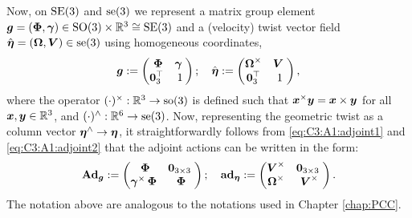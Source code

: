 %
Now, on $\textup{\textrm{SE}}(3)$ and $\textup{\textrm{se}}(3)$ we represent a matrix group element ${\boldsymbol{g}} = ({\boldsymbol{\Phi}}, {\boldsymbol{\gamma}}) \in  \textup{\textrm{SO}}(3) \times \mathbb{R}^3 \cong \textup{\textrm{SE}}(3)$ and a (velocity) twist vector field $\hat{{\boldsymbol{\eta}}} = (\boldsymbol{\Omega},{\boldsymbol{V}}) \in \textup{\textrm{se}}(3)$ using homogeneous coordinates,
%
\begin{align}
    {\boldsymbol{g}}  := 
    \begin{pmatrix}
    \; {{\boldsymbol{\Phi}}} & {\boldsymbol{\gamma}} \; \\
    \boldsymbol{0}_3^\top & 1
    \end{pmatrix}; \quad
    \hat{{\boldsymbol{\eta}}} := 
    \begin{pmatrix}
    \boldsymbol{\Omega}^{\times} & \boldsymbol{V} \; \\
    \boldsymbol{0}_3^\top & 1
    \end{pmatrix},
\end{align}
%
where the operator $(\cdot)^{\times}:\mathbb{R}^3 \to \textup{\textrm{so}}(3)$ is defined such that ${\boldsymbol{x}}^\times{\boldsymbol{y}} = {\boldsymbol{x}} \times {\boldsymbol{y}}$ for all ${\boldsymbol{x}},{\boldsymbol{y}} \in \mathbb{R}^3$, and $(\cdot)^\wedge:\mathbb{R}^6 \to \textup{\textrm{se}}(3)$. Now, representing the geometric twist as a column vector ${\boldsymbol{\eta}}^\wedge \to {\boldsymbol{\eta}}$, it straightforwardly follows from \eqref{eq:C3:A1:adjoint1} and \eqref{eq:C3:A1:adjoint2} that the adjoint actions can be written in the form:
%
\begin{align}
    \textbf{Ad}_{\boldsymbol{g}}  := 
    \begin{pmatrix}
    \; {{\boldsymbol{\Phi}}} & \boldsymbol{0}_{3\times3} \; \\
    {\boldsymbol{\gamma}}^{\times}\,{{\boldsymbol{\Phi}}} & {{\boldsymbol{\Phi}}}
    \end{pmatrix}; \quad
    \textbf{ad}_{{\boldsymbol{\eta}}}  := 
    \begin{pmatrix}
    {\boldsymbol{V}}^{\times} & \boldsymbol{0}_{3\times3} \; \\
    \boldsymbol{\Omega}^{\times} & {\boldsymbol{V}}^{\times} 
    \end{pmatrix}.
\end{align}
The notation above are analogous to the notations used in Chapter \ref{chap:PCC}. \\ \vspace{-3mm}

